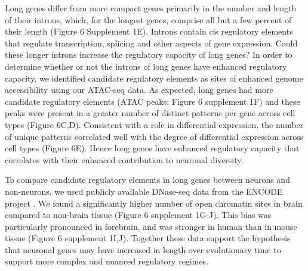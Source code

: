 Long genes differ from more compact genes primarily in the number and length of their introns, which, for the longest genes, comprise all but a few percent of their length (Figure 6 Supplement 1E). Introns contain cis regulatory elements that regulate transcription, splicing and other aspects of gene expression\citep{Rebollo_2012,Friedli_2015}. Could these longer introns increase the regulatory capacity of long genes? In order to determine whether or not the introns of long genes have enhanced regulatory capacity, we identified candidate regulatory elements as sites of enhanced genome accessibility using our ATAC-seq data. As expected, long genes had more candidate regulatory elements (ATAC peaks; Figure 6 supplement 1F) and these peaks were present in a greater number of distinct patterns per gene across cell types (Figure 6C,D). Consistent with a role in differential expression, the number of unique patterns correlated well with the degree of differential expression across cell types (Figure 6E). Hence long genes have enhanced regulatory capacity that correlates with their enhanced contribution to neuronal diversity.

To compare candidate regulatory elements in long genes between neurons and non-neurons, we used publicly available DNase-seq data from the ENCODE project \citep{Dunham_2012}. We found a significantly higher number of open chromatin sites in brain compared to non-brain tissue (Figure 6 supplement 1G-J). This bias was particularly pronounced in forebrain, and was stronger in human than in mouse tissue (Figure 6 supplement 1I,J). Together these data support the hypothesis that neuronal genes may have increased in length over evolutionary time to support more complex and nuanced regulatory regimes. 





